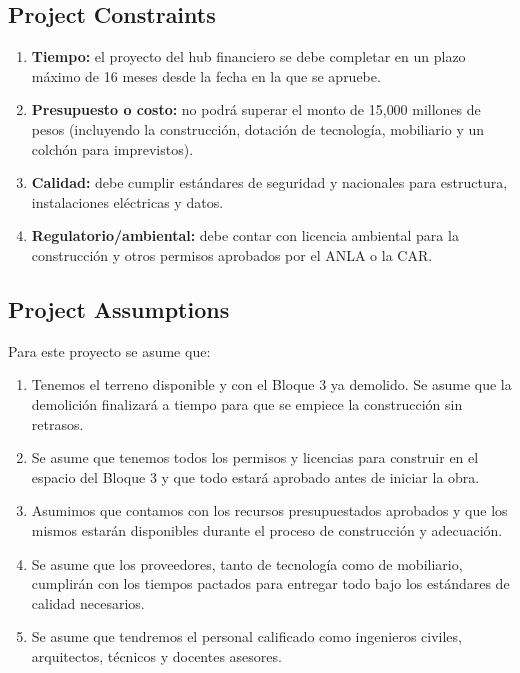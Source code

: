 \subsection{Project Constraints}

\begin{enumerate}
    \item \textbf{Tiempo:} el proyecto del hub financiero se debe completar en un plazo máximo de 16 meses desde la fecha en la que se apruebe.
    \item \textbf{Presupuesto o costo:} no podrá superar el monto de 15{,}000 millones de pesos (incluyendo la construcción, dotación de tecnología, mobiliario y un colchón para imprevistos).
    \item \textbf{Calidad:} debe cumplir estándares de seguridad y nacionales para estructura, instalaciones eléctricas y datos.
    \item \textbf{Regulatorio/ambiental:} debe contar con licencia ambiental para la construcción y otros permisos aprobados por el ANLA o la CAR.
\end{enumerate}

\subsection{Project Assumptions}

Para este proyecto se asume que:

\begin{enumerate}
    \item Tenemos el terreno disponible y con el Bloque 3 ya demolido. Se asume que la demolición finalizará a tiempo para que se empiece la construcción sin retrasos.
    \item Se asume que tenemos todos los permisos y licencias para construir en el espacio del Bloque 3 y que todo estará aprobado antes de iniciar la obra.
    \item Asumimos que contamos con los recursos presupuestados aprobados y que los mismos estarán disponibles durante el proceso de construcción y adecuación.
    \item Se asume que los proveedores, tanto de tecnología como de mobiliario, cumplirán con los tiempos pactados para entregar todo bajo los estándares de calidad necesarios.
    \item Se asume que tendremos el personal calificado como ingenieros civiles, arquitectos, técnicos y docentes asesores.
\end{enumerate}
